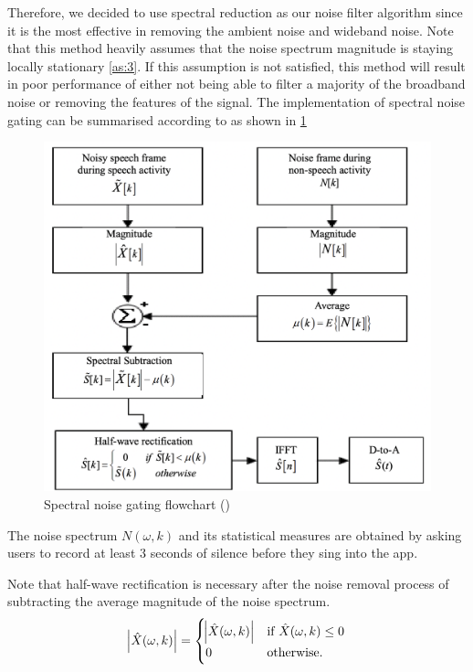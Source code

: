 Therefore, we decided to use spectral reduction as our noise filter algorithm since it is the most effective in removing the ambient noise 
and wideband noise. Note that this method heavily assumes that the noise spectrum magnitude is staying locally 
stationary \cref{as:3}. If this assumption is not satisfied, this method will result in poor performance of either not being able to filter
 a majority of the broadband noise or removing the features of the signal.
The implementation of spectral noise gating can be summarised according to \cite{spectralflowchart} as shown in \cref{spectralflowchart}
\begin{figure}
	\centering
	\includegraphics[scale=0.35]{Figures/spectralprocess.png}
	\caption{Spectral noise gating flowchart (\cite{spectralflowchart})}
	\label{spectralflowchart}
\end{figure}
The noise spectrum $N(\omega,k)$ and its statistical measures are obtained by asking users to record at least 3 seconds of silence 
before they sing into the app.

Note that half-wave rectification is necessary after the noise removal process of subtracting the average magnitude of the noise spectrum. 
\begin{equation}
    \abs{\hat{X}(\omega,k)} = \begin{cases}
        \abs{\hat{X}(\omega,k)}   & \text{if } \hat{X}(\omega,k) \leq 0\\
        0                     & \text{otherwise.}
    \end{cases}
\end{equation}

